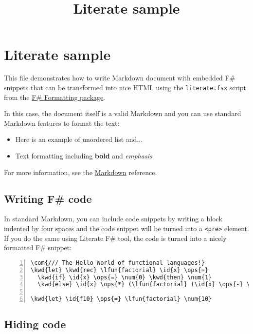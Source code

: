 \documentclass{article}
\title{Literate sample
}
\date{}
\newcommand{\id}[1]{\textcolor[HTML]{000000}{#1}}
\newcommand{\kwd}[1]{\textcolor[HTML]{0000FF}{#1}}
\newcommand{\com}[1]{\textcolor[HTML]{008000}{#1}}
\newcommand{\ops}[1]{\textcolor[HTML]{000000}{#1}}
\newcommand{\num}[1]{\textcolor[HTML]{000000}{#1}}
\newcommand{\lfun}[1]{\textcolor[HTML]{0000A0}{#1}}
\begin{document}
\maketitle

\section*{Literate sample}



This file demonstrates how to write Markdown document with 
embedded F\# snippets that can be transformed into nice HTML 
using the \texttt{literate.fsx} script from the \href{http://tpetricek.github.com/FSharp.Formatting}{F\# Formatting
package}.


In this case, the document itself is a valid Markdown and 
you can use standard Markdown features to format the text:
\begin{itemize}
\item Here is an example of unordered list and...

\item Text formatting including \textbf{bold} and \emph{emphasis}

\end{itemize}



For more information, see the \href{http://daringfireball.net/projects/markdown}{Markdown} reference.
\subsection*{Writing F\# code}



In standard Markdown, you can include code snippets by 
writing a block indented by four spaces and the code 
snippet will be turned into a \texttt{<pre>} element. If you do 
the same using Literate F\# tool, the code is turned into
a nicely formatted F\# snippet:
\begin{Verbatim}[commandchars=\\\{\}, numbers=left]
\com{/// The Hello World of functional languages!}
\kwd{let} \kwd{rec} \lfun{factorial} \id{x} \ops{=} 
  \kwd{if} \id{x} \ops{=} \num{0} \kwd{then} \num{1} 
  \kwd{else} \id{x} \ops{*} (\lfun{factorial} (\id{x} \ops{-} \num{1}))

\kwd{let} \id{f10} \ops{=} \lfun{factorial} \num{10}

\end{Verbatim}

\subsection*{Hiding code}
\end{document}
